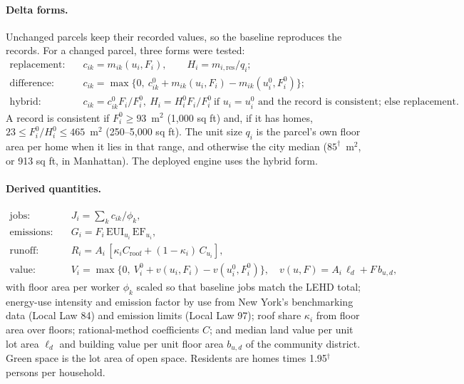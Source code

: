 \documentclass[10pt]{article}
\begin{document}
\paragraph{Delta forms.} Unchanged parcels keep their recorded values, so the baseline reproduces the records. For a
changed parcel, three forms were tested:
\begin{align}
\text{replacement:}\quad & c_{ik} = m_{ik}(u_i, F_i),\qquad H_i = m_{i,\mathrm{res}}/q_i;\\
\text{difference:}\quad & c_{ik} = \max\{0,\ c^0_{ik} + m_{ik}(u_i, F_i) - m_{ik}(u^0_i, F^0_i)\};\\
\text{hybrid:}\quad & c_{ik} = c^0_{ik} F_i / F^0_i,\ H_i = H^0_i F_i / F^0_i \ \text{if } u_i = u^0_i \text{ and the record
is consistent; else replacement.}
\end{align}
A record is consistent if $F^0_i \geq 93$~m$^2$ (1,000 sq ft) and, if it has homes,
$23 \leq F^0_i/H^0_i \leq 465$~m$^2$ (250--5,000 sq ft). The unit
size $q_i$ is the parcel's own floor area per home when it lies in that range, and otherwise the city median
($85^\dagger$~m$^2$, or 913 sq ft, in Manhattan). The deployed engine uses the hybrid form.

\paragraph{Derived quantities.}
\begin{align}
\text{jobs:}\quad & J_i = \textstyle\sum_k c_{ik}/\phi_k,\\
\text{emissions:}\quad & G_i = F_i\,\mathrm{EUI}_{u_i}\,\mathrm{EF}_{u_i},\\
\text{runoff:}\quad & R_i = A_i\,[\kappa_i C_\mathrm{roof} + (1-\kappa_i)\,C_{u_i}],\\
\text{value:}\quad & V_i = \max\{0,\ V^0_i + v(u_i, F_i) - v(u^0_i, F^0_i)\},\quad v(u,F) = A_i\,\ell_d + F\,b_{u,d},
\end{align}
with floor area per worker $\phi_k$ scaled so that baseline jobs match the LEHD total; energy-use intensity and emission
factor by use from New York's benchmarking data (Local Law 84) and emission limits (Local Law 97); roof share
$\kappa_i$ from floor area over floors; rational-method coefficients $C$; and median land value per unit lot area
$\ell_d$ and building value per unit floor area $b_{u,d}$ of the community district. Green space is the lot area of open
space. Residents are homes times 1.95$^\dagger$ persons per household.
\end{document}
